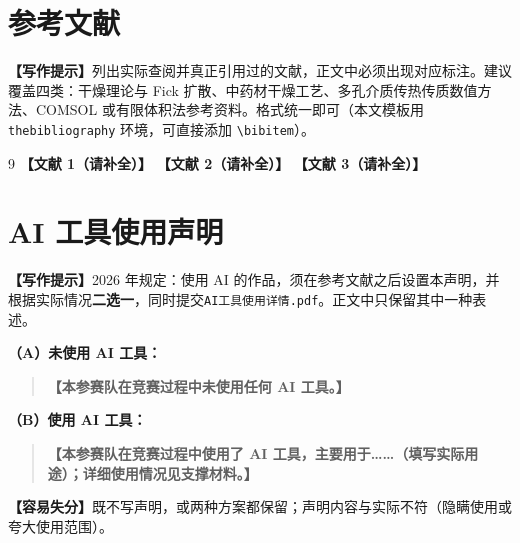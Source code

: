 \documentclass[12pt,a4paper]{article}
\newcommand{\prompt}[1]{\par\noindent\textbf{【写作提示】}#1\par}      %
\newcommand{\pitfall}[1]{\par\noindent\textbf{【容易失分】}#1\par}     %
\newcommand{\ph}[1]{\textbf{【#1】}}                                   %
\newcommand{\handbook}[2]{\par\noindent\textbf{【手册索引：#1】} #2\par}
\begin{document}



\section{参考文献}

\prompt{列出实际查阅并真正引用过的文献，正文中必须出现对应标注。建议覆盖四类：干燥理论与 Fick 扩散、中药材干燥工艺、多孔介质传热传质数值方法、COMSOL 或有限体积法参考资料。格式统一即可（本文模板用 \texttt{thebibliography} 环境，可直接添加 \texttt{\textbackslash bibitem}）。}

\begin{thebibliography}{9}
 \ph{文献 1（请补全）}
 \ph{文献 2（请补全）}
 \ph{文献 3（请补全）}
\end{thebibliography}

\clearpage

\section*{AI 工具使用声明}

\prompt{2026 年规定：使用 AI 的作品，须在参考文献之后设置本声明，并根据实际情况\textbf{二选一}，同时提交\texttt{AI工具使用详情.pdf}。正文中只保留其中一种表述。}

\noindent\textbf{（A）未使用 AI 工具：}

\begin{quote}
\ph{本参赛队在竞赛过程中未使用任何 AI 工具。}
\end{quote}

\noindent\textbf{（B）使用 AI 工具：}

\begin{quote}
\ph{本参赛队在竞赛过程中使用了 AI 工具，主要用于……（填写实际用途）；详细使用情况见支撑材料。}
\end{quote}

\pitfall{既不写声明，或两种方案都保留；声明内容与实际不符（隐瞒使用或夸大使用范围）。}
\end{document}
